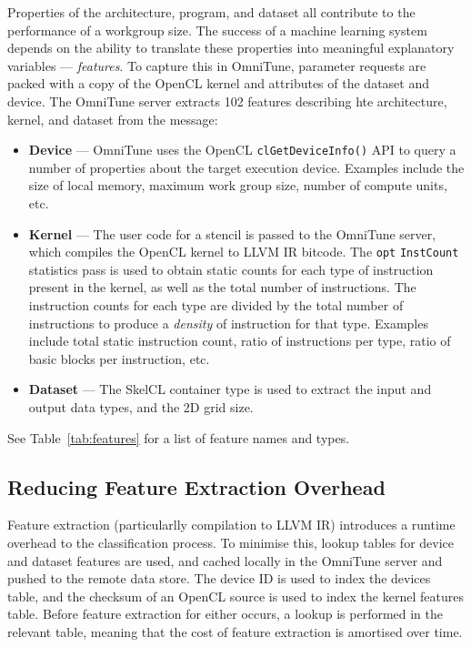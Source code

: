 Properties of the architecture, program, and dataset all contribute to
the performance of a workgroup size. The success of a machine learning
system depends on the ability to translate these properties into
meaningful explanatory variables --- \emph{features}. To capture this
in OmniTune, parameter requests are packed with a copy of the OpenCL
kernel and attributes of the dataset and device. The OmniTune server
extracts 102 features describing hte architecture, kernel, and dataset
from the message:
%
\begin{itemize}
  \item \textbf{Device} --- OmniTune uses the OpenCL
  \texttt{clGetDeviceInfo()} API to query a number of properties about
  the target execution device. Examples include the size of local
  memory, maximum work group size, number of compute units, etc.
  \item \textbf{Kernel} --- The user code for a stencil is passed to the
  OmniTune server, which compiles the OpenCL kernel to LLVM IR
  bitcode. The \texttt{opt} \texttt{InstCount} statistics pass is used
  to obtain static counts for each type of instruction present in the
  kernel, as well as the total number of instructions. The instruction
  counts for each type are divided by the total number of instructions
  to produce a \emph{density} of instruction for that type. Examples
  include total static instruction count, ratio of instructions per
  type, ratio of basic blocks per instruction, etc.
  \item \textbf{Dataset} --- The SkelCL container type is used to
  extract the input and output data types, and the 2D grid size.
\end{itemize}
%
See Table~\ref{tab:features} for a list of feature names and types.


\subsection{Reducing Feature Extraction Overhead}


Feature extraction (particularlly compilation to LLVM IR) introduces a
runtime overhead to the classification process. To minimise this,
lookup tables for device and dataset features are used, and cached
locally in the OmniTune server and pushed to the remote data
store. The device ID is used to index the devices table, and the
checksum of an OpenCL source is used to index the kernel features
table. Before feature extraction for either occurs, a lookup is
performed in the relevant table, meaning that the cost of feature
extraction is amortised over time.


